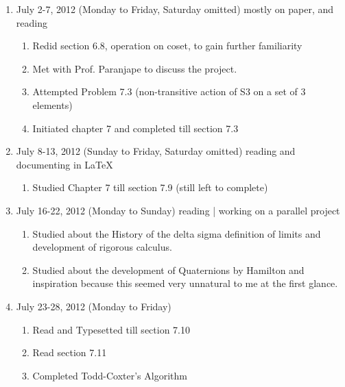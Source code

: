 \begin{enumerate}
		\item July 2-7, 2012 (Monday to Friday, Saturday omitted) {mostly on paper, and reading}
		\begin{enumerate}
		\item Redid section 6.8, operation on coset, to gain further familiarity
		\item Met with Prof. Paranjape to discuss the project.
		\item Attempted Problem 7.3 (non-transitive action of S3 on a set of 3 elements)
		\item Initiated chapter 7 and completed till section 7.3
		\end{enumerate}
		
		\item July 8-13, 2012 (Sunday to Friday, Saturday omitted) {reading and documenting in LaTeX}
		\begin{enumerate}
		\item Studied Chapter 7 till section 7.9 (still left to complete)
		\end{enumerate}
		
		\item July 16-22, 2012 (Monday to Sunday) {reading | working on a parallel project}
		\begin{enumerate}
		\item Studied about the History of the delta sigma definition of limits and development of rigorous calculus.
		\item Studied about the development of Quaternions by Hamilton and inspiration because this seemed very unnatural to me at the first glance.
		\end{enumerate}
		
		\item July 23-28, 2012 (Monday to Friday)
		\begin{enumerate}
		\item Read and Typesetted till section 7.10
		\item Read section 7.11
		\item Completed Todd-Coxter's Algorithm
		\end{enumerate}

	\end{enumerate}
